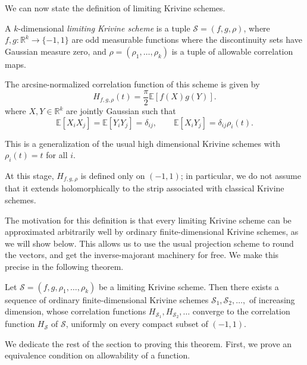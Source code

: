 We can now state the definition of limiting Krivine schemes. 

\begin{definition}
A $k$-dimensional \emph{limiting Krivine scheme} is a tuple $\mathcal{S} = (f, g, \rho)$, where  \(f,g:\mathbb{R}^k\to\{-1,1\}\) are odd measurable functions where the discontinuity sets have Gaussian measure zero, and \(\rho = (\rho_1,\ldots,\rho_k)\) is a tuple of allowable correlation maps.  

The arcsine-normalized correlation function of this scheme is given by 
\[
H_{f, g, \rho}(t)
=
\frac{\pi}{2}\mathbb{E}[f(X)g(Y)].
\]
where \(X,Y\in\mathbb{R}^k\) are jointly Gaussian such that
\[
\mathbb{E}[X_iX_j]
=
\mathbb{E}[Y_iY_j]
=
\delta_{ij},
\qquad
\mathbb{E}[X_iY_j]
=
\delta_{ij}\rho_i(t).
\]
\end{definition}

\begin{remark}
    This is a generalization of the usual high dimensional Krivine schemes with $\rho_i(t) = t$ for all $i$. 

    At this stage, \(H_{f, g, \rho}\) is defined only on \((-1,1)\); in particular, we do not assume that it extends holomorphically to the strip associated with classical Krivine schemes.
\end{remark}

The motivation for this definition is that every limiting Krivine scheme can be approximated arbitrarily well by ordinary finite-dimensional Krivine schemes, as we will show below. This allows us to use the usual projection scheme to round the vectors, and get the inverse-majorant machinery for free. We make this precise in the following theorem.  

\begin{theorem}
Let \(\mathcal S=(f,g,\rho_1,\ldots,\rho_k)\) be a limiting Krivine scheme. Then there exists a sequence of ordinary finite-dimensional Krivine schemes
\(
\mathcal S_1,\mathcal S_2,\ldots,
\)
of increasing dimension, whose correlation functions $H_{\mathcal S_1}, H_{\mathcal S_2}, \ldots$ converge to the correlation function $H_{\mathcal S}$ of \(\mathcal S\), uniformly on every compact subset of \((-1,1)\).
\end{theorem}

We dedicate the rest of the section to proving this theorem. First, we prove an equivalence condition on allowability of a function. 

